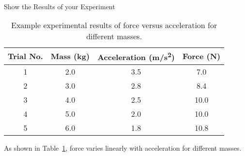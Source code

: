 Show the Results of your Experiment


\begin{table}[h!]
	\centering
	\begin{tabular}{|c|c|c|c|}
		\hline
		Trial No. & Mass (kg) & Acceleration (m/s\textsuperscript{2}) & Force (N) \\ \hline
		1         & 2.0       & 3.5                                   & 7.0       \\ \hline
		2         & 3.0       & 2.8                                   & 8.4       \\ \hline
		3         & 4.0       & 2.5                                   & 10.0      \\ \hline
		4         & 5.0       & 2.0                                   & 10.0      \\ \hline
		5         & 6.0       & 1.8                                   & 10.8      \\ \hline
	\end{tabular}
	\caption{Example experimental results of force versus acceleration for different masses.}
	\label{tab:example_results}
\end{table}

As shown in Table~\ref{tab:example_results}, force varies linearly with acceleration for different masses.

\vspace{12pt}


